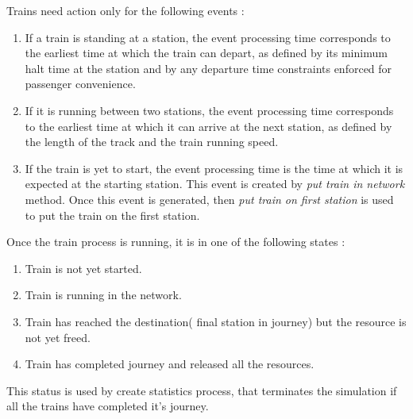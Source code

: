 Trains need action only for the following events :
\begin{enumerate}
\item If a train is standing at a station, the event processing time 
    corresponds to the earliest time at which the train can depart,   
    as defined by its minimum halt time at the station and by any     
    departure time constraints enforced for passenger convenience.
\item If it is running between two stations, the event processing time        
    corresponds to the earliest time at which it can arrive at the         
    next station, as defined by the length of the track and the train      
    running speed.

\item  If the train is yet to start, the event processing                      
    time is the time at which it is expected at the starting station. This event is created 
    by \textit{put train in network} method. Once this event is generated, then \textit{put train on 
    first station} is used to put the train on the first station.

\end{enumerate}


Once the train process is running, it is in one of the following states :
\begin {enumerate}
\item Train is not yet started.
\item Train is running in the network.
\item Train has reached the destination( final station in journey) but the resource is not yet freed.
\item Train has completed journey and released all the resources.
\end {enumerate}

This status is used by create statistics process, that terminates the simulation if all the trains have completed it's 
journey.